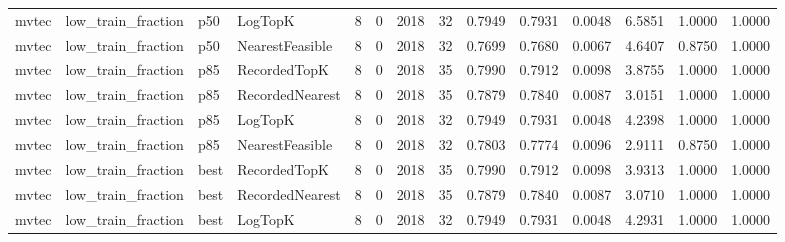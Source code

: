 \begin{tabular}{llllrrrrrrrrrr}
   mvtec &   low\_train\_fraction &    p50 &         LogTopK &           8 &          0 &           2018 &                  32 &         0.7949 &          0.7931 &                    0.0048 &         6.5851 &                 1.0000 &                  1.0000 \\
   mvtec &   low\_train\_fraction &    p50 & NearestFeasible &           8 &          0 &           2018 &                  32 &         0.7699 &          0.7680 &                    0.0067 &         4.6407 &                 0.8750 &                  1.0000 \\
   mvtec &   low\_train\_fraction &    p85 &    RecordedTopK &           8 &          0 &           2018 &                  35 &         0.7990 &          0.7912 &                    0.0098 &         3.8755 &                 1.0000 &                  1.0000 \\
   mvtec &   low\_train\_fraction &    p85 & RecordedNearest &           8 &          0 &           2018 &                  35 &         0.7879 &          0.7840 &                    0.0087 &         3.0151 &                 1.0000 &                  1.0000 \\
   mvtec &   low\_train\_fraction &    p85 &         LogTopK &           8 &          0 &           2018 &                  32 &         0.7949 &          0.7931 &                    0.0048 &         4.2398 &                 1.0000 &                  1.0000 \\
   mvtec &   low\_train\_fraction &    p85 & NearestFeasible &           8 &          0 &           2018 &                  32 &         0.7803 &          0.7774 &                    0.0096 &         2.9111 &                 0.8750 &                  1.0000 \\
   mvtec &   low\_train\_fraction &   best &    RecordedTopK &           8 &          0 &           2018 &                  35 &         0.7990 &          0.7912 &                    0.0098 &         3.9313 &                 1.0000 &                  1.0000 \\
   mvtec &   low\_train\_fraction &   best & RecordedNearest &           8 &          0 &           2018 &                  35 &         0.7879 &          0.7840 &                    0.0087 &         3.0710 &                 1.0000 &                  1.0000 \\
   mvtec &   low\_train\_fraction &   best &         LogTopK &           8 &          0 &           2018 &                  32 &         0.7949 &          0.7931 &                    0.0048 &         4.2931 &                 1.0000 &                  1.0000 \\

\end{tabular}
